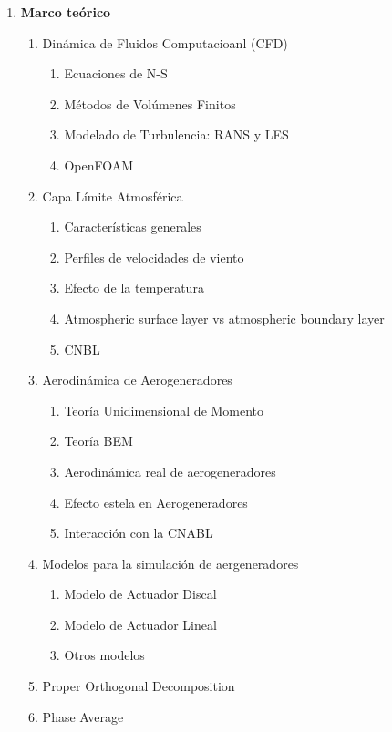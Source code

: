 \begin{enumerate}
  \item \textbf{Marco teórico}
  \begin{enumerate}[label*=\arabic*.] 
  	\item Dinámica de Fluidos Computacioanl (CFD)
  	\begin{enumerate}[label*=\arabic*.]
  		\item Ecuaciones de N-S
  		\item Métodos de Volúmenes Finitos
  		\item Modelado de Turbulencia: RANS y LES
  		\item OpenFOAM
  	\end{enumerate}
    	\item Capa Límite Atmosférica
    		\begin{enumerate}[label*=\arabic*.]
    		\item Características generales
    		\item Perfiles de velocidades de viento
    		\item Efecto de la temperatura
    		\item Atmospheric surface layer vs atmospheric boundary layer
    		\item CNBL
    		\end{enumerate}
    \item Aerodinámica de Aerogeneradores
    		\begin{enumerate}[label*=\arabic*.]
    			\item Teoría Unidimensional de Momento
    			\item Teoría BEM
    			\item Aerodinámica real de aerogeneradores
    			\item Efecto estela en Aerogeneradores
    			\item Interacción con la CNABL
    		\end{enumerate}
    	\item Modelos para la simulación de aergeneradores
    		\begin{enumerate}[label*=\arabic*.]
    		\item Modelo de Actuador Discal
    		\item Modelo de Actuador Lineal
    		\item Otros modelos
    		\end{enumerate}
    	\item Proper Orthogonal Decomposition
    	\item Phase Average
  \end{enumerate} 


\end{enumerate}
